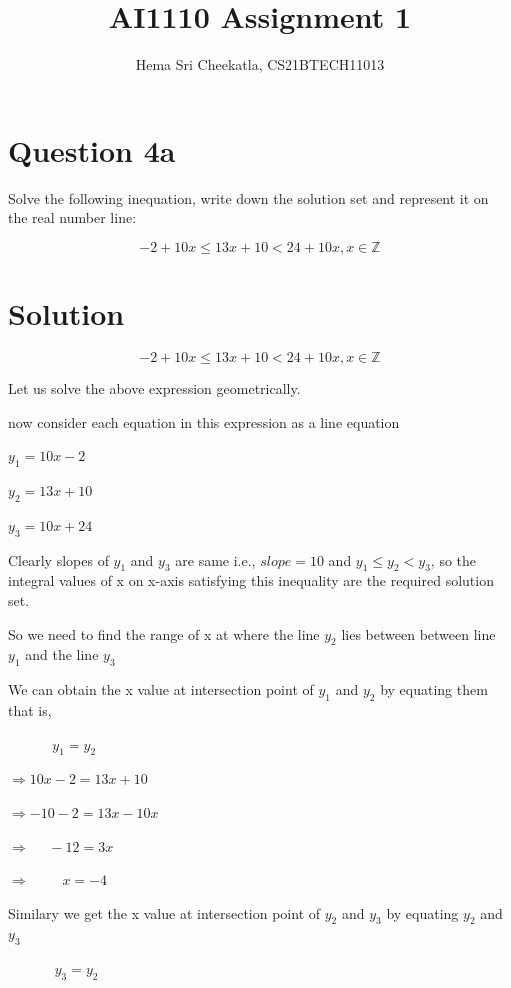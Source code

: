 \documentclass[16pt, a4paper, two column]{article}
\title{AI1110 Assignment 1}
\author{Hema Sri Cheekatla, CS21BTECH11013}
\begin{document}
\maketitle
\section*{Question 4a}
Solve the following inequation, write down the solution set and represent it on the real number line:

\[  -2 + 10x \leq 13x + 10 < 24 + 10x,  x\in \mathbb{Z} \]

\section*{Solution}
\[  -2 + 10x \leq 13x + 10 < 24 + 10x,  x\in \mathbb{Z} \]

Let us solve the above expression geometrically.

now consider each equation in this expression as a line equation

$y_1 = 10x - 2$

$y_2 = 13x + 10$

$y_3 = 10x + 24$

Clearly slopes of $y_1$ and $y_3$ are same i.e., $slope = 10$\newline
and $y_1 \leq y_2 < y_3 $, so the integral values of x on x-axis satisfying this inequality are the required solution set.

So we need to find the range of x at where the line $y_2$ lies between between line $y_1$ and the line $y_3$

We can obtain the x value at intersection point of $y_1$ and $y_2$ by equating them that is,


$\hspace{20pt}\hspace{18pt} y_1 = y_2$

$\Rightarrow 10x - 2 = 13x + 10$

$\Rightarrow -10 -2 = 13x - 10x$

$\Rightarrow \hspace{16pt} -12 = 3x$

$\Rightarrow \hspace{28pt} x = -4$

Similary we get the x value at intersection point of $y_2$ and $y_3$ by equating $y_2$ and $y_3$


$\hspace{20pt}\hspace{20pt} y_3 = y_2$
\end{document}
